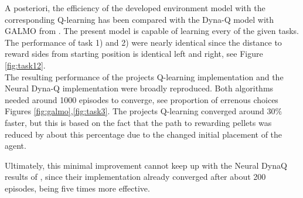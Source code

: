 \documentclass[a4paper]{article}
\begin{document}
	\par A posteriori, the efficiency of the developed environment model with the corresponding Q-learning has been compared with the Dyna-Q model with GALMO from \citet{NeuralDynaQ}. The present model is capable of learning every of the given tasks. The performance of task 1) and 2) were nearly identical since the distance to reward sides from starting position is identical left and right, see Figure \ref{fig:task12}. \\
	The resulting performance of the projects Q-learning implementation and the Neural Dyna-Q implementation were broadly reproduced. Both algorithms needed around 1000 episodes to converge, see proportion of errenous choices Figures \ref{fig:galmo},\ref{fig:task3}. The projects Q-learning converged around $30\%$ faster, but this is based on the fact that the path to rewarding pellets was reduced by about this percentage due to the changed initial placement of the agent. 
	\par Ultimately, this minimal improvement cannot keep up with the Neural DynaQ results of \citet{NeuralDynaQ}, since their implementation already converged after about 200 episodes, being five times more effective. 
	
\end{document}
